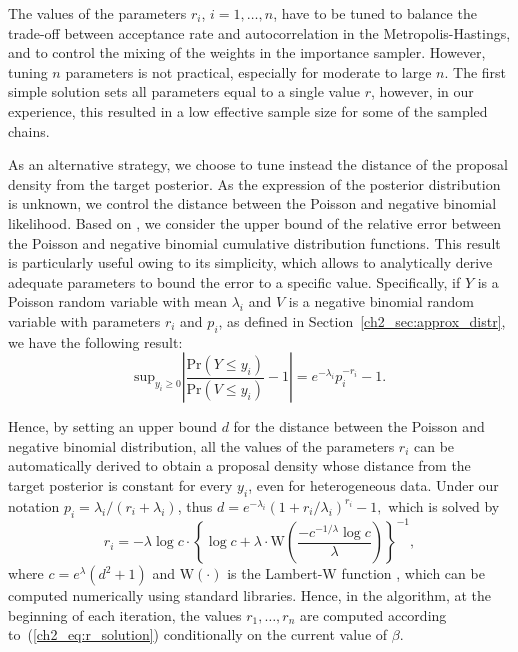 The values of the parameters $r_i$, $i=1,\dots,n$, have to be tuned to balance the trade-off between acceptance rate and autocorrelation in the Metropolis-Hastings, and to control the mixing of the weights in the importance sampler. However, tuning $n$ parameters is not practical, especially for moderate to large $n$.
The first simple solution sets all  parameters equal to a single value $r$, however, in our experience, this resulted in a low effective sample size for some of the sampled chains.

As an alternative strategy, we choose to tune instead the distance of the proposal density from the target posterior.
As the expression of the posterior distribution is unknown, we control the distance between the Poisson and negative binomial likelihood. %
Based on \textcite{Teerapabolarn2012}, we consider the upper bound of the relative error between the Poisson and negative binomial cumulative distribution functions. This result is particularly useful owing to its simplicity, which allows to analytically derive adequate parameters to bound the error to a specific value. Specifically, if $Y$ is a Poisson random variable with mean $\lambda_i$ and $V$ is a negative binomial random variable with parameters $r_i$ and $p_i$, as defined in Section~\ref{ch2_sec:approx_distr}, we have the following result:
\begin{equation*}
\mathrm{sup}_{y_i\geq 0} \left\lvert \frac{\mbox{Pr}(Y\leq y_i)}{\mbox{Pr}(V\leq y_i)} -1 \right\rvert = e^{-\lambda_i} p_i^{-r_i} - 1.
\end{equation*}

Hence, by setting an upper bound $d$ for the distance between the Poisson and negative binomial distribution, all the values of the parameters $r_i$ can be automatically derived to obtain a proposal density whose distance from the target posterior is constant for every $y_i$, even for heterogeneous data. Under our notation $p_i=\lambda_i/(r_i+\lambda_i)$, thus
$d = e^{-\lambda_i} ( 1 + r_i/\lambda_i)^{r_i} - 1,$
which is solved by
\begin{equation}
r_i = - \lambda \log c \cdot
\left\{ \log c + \lambda \cdot\mathrm{W}\left( \frac{-c^{-1/\lambda} \log c}{\lambda} \right) \right\}^{-1},
\label{ch2_eq:r_solution}
\end{equation}
where $c=e^{\lambda}(d^2+1)$ and $\mathrm{W}(\cdot)$ is the Lambert-W function \parencite{W}, which can be computed numerically using standard libraries. 
%
Hence, in the algorithm, at the beginning of each iteration, the values $r_1, \dots, r_n$ are computed according to~(\ref{ch2_eq:r_solution}) conditionally on the current value of $\beta$. %



